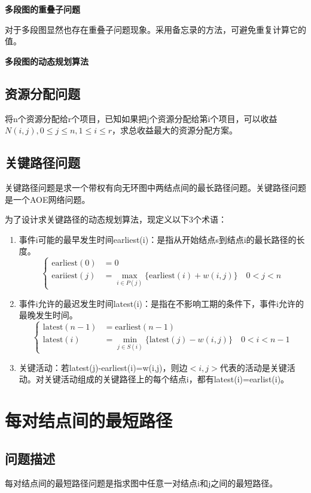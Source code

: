 \textbf{多段图的重叠子问题}

对于多段图显然也存在重叠子问题现象。采用备忘录的方法，可避免重复计算它的值。

\textbf{多段图的动态规划算法}

\subsection*{资源分配问题}
将n个资源分配给r个项目，已知如果把j个资源分配给第i个项目，可以收益$N(i,j),0\leq j\leq n,1\leq i\leq r$，求总收益最大的资源分配方案。
\subsection*{关键路径问题}
关键路径问题是求一个带权有向无环图中两结点间的最长路径问题。关键路径问题是一个AOE网络问题。

为了设计求关键路径的动态规划算法，现定义以下3个术语：
\begin{enumerate}
	\item 事件i可能的最早发生时间earliest(i)：是指从开始结点s到结点i的最长路径的长度。
	\begin{equation}
		\begin{cases}
			\mathrm{earliest}(0)&=0\\
			\mathrm{eariiest}(j)&=\max\limits_{i\in P(j)}\{\mathrm{earliest}(i)+w(i,j) \}\quad 0<j<n
		\end{cases}
	\end{equation}
	\item 事件i允许的最迟发生时间latest(i)：是指在不影响工期的条件下，事件i允许的最晚发生时间。
	\begin{equation}
	\begin{cases}
			\mathrm{latest}(n-1)&=\mathrm{earliest}(n-1)\\
			\mathrm{latest}(i)&=\min\limits_{j\in S(i)}\{\mathrm{latest}(j)-w(i,j) \}\quad 0<i<n-1
		\end{cases}
	\end{equation}
	\item 关键活动：若latest(j)-earliest(i)=w(i,j)，则边$<i,j>$代表的活动是关键活动。对关键活动组成的关键路径上的每个结点i，都有latest(i)=earlist(i)。
\end{enumerate}
\section{每对结点间的最短路径}
\subsection*{问题描述}
每对结点间的最短路径问题是指求图中任意一对结点i和j之间的最短路径。

